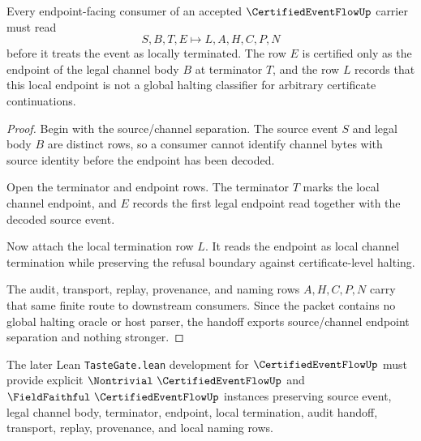\begin{theorem}
\label{thm:certified-event-flow-channel-termination-handoff}
Every endpoint-facing consumer of an accepted $\CertifiedEventFlowUp$ carrier must read
$$
S,B,T,E \longmapsto L,A,H,C,P,N
$$
before it treats the event as locally terminated. The row $E$ is certified only as the endpoint of the legal channel body $B$ at terminator $T$, and the row $L$ records that this local endpoint is not a global halting classifier for arbitrary certificate continuations.
\end{theorem}
\begin{proof}
Begin with the source/channel separation. The source event $S$ and legal body $B$ are distinct rows, so a consumer cannot identify channel bytes with source identity before the endpoint has been decoded.

Open the terminator and endpoint rows. The terminator $T$ marks the local channel endpoint, and $E$ records the first legal endpoint read together with the decoded source event.

Now attach the local termination row $L$. It reads the endpoint as local channel termination while preserving the refusal boundary against certificate-level halting.

The audit, transport, replay, provenance, and naming rows $A,H,C,P,N$ carry that same finite route to downstream consumers. Since the packet contains no global halting oracle or host parser, the handoff exports source/channel endpoint separation and nothing stronger.
\end{proof}



The later Lean \texttt{TasteGate.lean} development for $\CertifiedEventFlowUp$ must provide explicit $\Nontrivial\ \CertifiedEventFlowUp$ and $\FieldFaithful\ \CertifiedEventFlowUp$ instances preserving source event, legal channel body, terminator, endpoint, local termination, audit handoff, transport, replay, provenance, and local naming rows.

